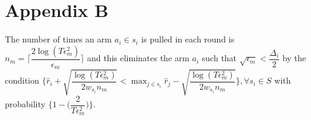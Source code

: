 \section*{Appendix B}

\begin{proposition}
The number of times an arm $a_{i}\in s_{i}$ is pulled in each round is $n_{m}=\bigg\lceil\dfrac{2\log{(T\epsilon_{m}^{2})}}{\epsilon_{m}}\bigg\rceil$ and this eliminates the arm $a_{i}$ such that $\sqrt{\epsilon_{m}}<\dfrac{\Delta_{i}}{2}$ by the condition $\bigg\lbrace\hat{r}_{i} + \sqrt{\dfrac{\log (T\epsilon_{m}^{2})}{2w_{s_{i}} n_{m}}} < \max_{j\in s_{i}}\hat{r}_{j} - \sqrt{\dfrac{\log (T\epsilon_{m}^{2})}{2w_{s_{i}} n_{m}}} \bigg\rbrace, \forall s_{i}\in S$ with probability $\bigg\lbrace 1-\bigg(\dfrac{2}{T\epsilon_{m}^{2}}\bigg)\bigg\rbrace$. 
\end{proposition}

